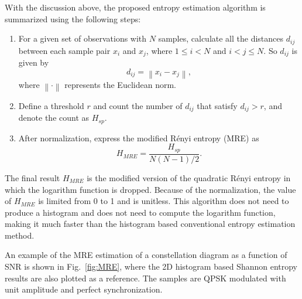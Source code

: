 \documentclass[12pt, draftclsnofoot, onecolumn]{IEEEtran}
\begin{document}
With the discussion above, the proposed entropy estimation algorithm is summarized using the following steps:
\begin{enumerate}
\item For a given set of observations with $N$ samples, calculate all the distances \(d_{ij}\) between each sample pair \(x_i\) and \(x_j\), where \(1\le i<N\) and \( i<j \le N\). 
So \(d_{ij}\) is given by
 \begin{equation}
d_{ij}=\left\|x_i-x_j \right\|,
\label{eq:distance}
\end{equation}
where \(\left\| \cdot \right\|\) represents the Euclidean norm.
\item Define a threshold \(r\) and count the number of \(d_{ij}\) that satisfy $d_{ij}>r$, and denote the count as $H_{sp}$.
\item After normalization, express the modified R\'enyi entropy (MRE) as
\begin{equation}
H_{MRE}= \frac{ H_{sp}}{ N(N-1)/2}.
\label{eq:entorpy_ad}
\end{equation}
\end{enumerate}



The final result \(H_{MRE}\) is the modified version of the quadratic R\'enyi entropy in which the logarithm function is dropped.
Because of the normalization, the value of $H_{MRE}$ is limited from 0 to 1 and is unitless.
This algorithm does not need to produce a histogram and does not need to compute the logarithm function, making it much faster than the histogram based conventional entropy estimation method.


An example of the MRE estimation of a constellation diagram as a function of SNR is shown in Fig.~\ref{fig:MRE}, where the 2D histogram based Shannon entropy results are also plotted as a reference.
The samples are QPSK modulated with unit amplitude and perfect synchronization.
\end{document}
